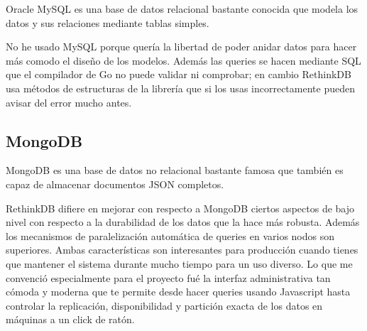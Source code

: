 Oracle MySQL es una base de datos relacional bastante conocida que modela los datos y sus relaciones mediante tablas simples.

No he usado MySQL porque quería la libertad de poder anidar datos para hacer más comodo el diseño de los modelos. Además las queries se hacen mediante SQL que el compilador de Go no puede validar ni comprobar; en cambio RethinkDB usa métodos de estructuras de la librería que si los usas incorrectamente pueden avisar del error mucho antes.

\subsection{MongoDB}

MongoDB es una base de datos no relacional bastante famosa que también es capaz de almacenar documentos JSON completos.

RethinkDB difiere en mejorar con respecto a MongoDB ciertos aspectos de bajo nivel\cite{redbvsmongo} con respecto a la durabilidad de los datos que la hace más robusta. Además los mecanismos de paralelización automática de queries en varios nodos son superiores. Ambas características son interesantes para producción cuando tienes que mantener el sistema durante mucho tiempo para un uso diverso. Lo que me convenció especialmente para el proyecto fué la interfaz administrativa tan cómoda y moderna que te permite desde hacer queries usando Javascript hasta controlar la replicación, disponibilidad y partición exacta de los datos en máquinas a un click de ratón.